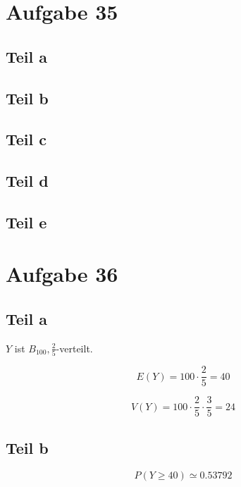 \documentclass[10pt,a4paper]{article}
\begin{document}
\section{Aufgabe 35}

\subsection{Teil a}

\subsection{Teil b}

\subsection{Teil c}

\subsection{Teil d}

\subsection{Teil e}

\section{Aufgabe 36}

\subsection{Teil a}

$Y$ ist $B_{100}, \frac{2}{5}$-verteilt.

\begin{equation}
  E(Y) = 100 \cdot \frac{2}{5} = 40
\end{equation}

\begin{equation}
  V(Y) = 100 \cdot \frac{2}{5} \cdot \frac{3}{5} = 24
\end{equation}

\subsection{Teil b}

\begin{equation}
  P(Y \ge 40) \simeq 0.53792
\end{equation}
\end{document}
